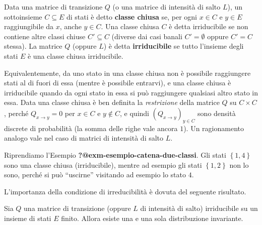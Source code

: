 \documentclass[
  italian,
  letterpaper,
]{book}
\newcommand{\cur}[1]{\left\{ #1 \right\}}
\theoremstyle{definition}
\theoremstyle{remark}
\begin{document}
Data una matrice di transizione \(Q\) (o una matrice di intensità di
salto \(L\)), un sottoinsieme \(C \subseteq E\) di stati è detto
\textbf{classe chiusa} se, per ogni \(x \in C\) e \(y \in E\)
raggiungibile da \(x\), anche \(y \in C\). Una classe chiusa \(C\) è
detta irriducibile se non contiene altre classi chiuse
\(C' \subseteq C\) (diverse dai casi banali \(C' = \emptyset\) oppure
\(C' = C\) stessa). La matrice \(Q\) (oppure \(L\)) è detta
\textbf{irriducibile} se tutto l'insieme degli stati \(E\) è una classe
chiusa irriducibile.

Equivalentemente, da uno stato in una classe chiusa non è possibile
raggiungere stati al di fuori di essa (mentre è possibile entrarvi), e
una classe chiusa è irriducibile quando da ogni stato in essa si può
raggiungere qualsiasi altro stato in essa. Data una classe chiusa è ben
definita la \emph{restrizione} della matrice \(Q\) su \(C \times C\),
perché \(Q_{x \to y}=0\) per \(x \in C\) e \(y \notin C\), e quindi
\((Q_{x \to y})_{y \in C}\) sono densità discrete di probabilità (la
somma delle righe vale ancora \(1\)). Un ragionamento analogo vale nel
caso di matrici di intensità di salto \(L\).

Riprendiamo l'Esempio \textbf{?@exm-esempio-catena-due-classi}. Gli
stati \(\cur{1,4}\) sono una classe chiusa (irriducibile), mentre ad
esempio gli stati \(\cur{1,2}\) non lo sono, perché si può ``uscirne''
visitando ad esempio lo stato \(4\).

L'importanza della condizione di irreducibilità è dovuta del seguente
risultato.

Sia \(Q\) una matrice di transizione (oppure \(L\) di intensità di
salto) irriducibile su un insieme di stati \(E\) finito. Allora esiste
una e una sola distribuzione invariante.
\end{document}
